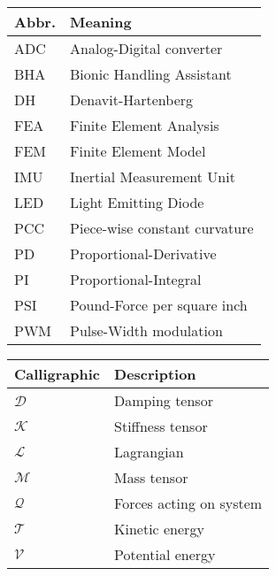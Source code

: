 \begin{spacing}{0.9}
\begin{multicols}{2}
\begin{table}[H]
\centering
    \begin{tabular}{p{1.5cm} p{5cm}} \hline
    \textbf{Abbr.}    &   \textbf{Meaning }\\ \hline
    ADC     &  Analog-Digital converter\\
    BHA    &  Bionic Handling Assistant\\
    DH    &  Denavit-Hartenberg\\
    FEA     &  Finite Element Analysis \\
    FEM     &  Finite Element Model \\
    IMU    & Inertial Measurement Unit \\
    LED   & Light Emitting Diode \\
    PCC   & Piece-wise constant curvature \\
    PD    & Proportional-Derivative \\
    PI   & Proportional-Integral \\
    PSI    & Pound-Force per square inch\\
    PWM    & Pulse-Width modulation\\  \hline
    \end{tabular}
\end{table}



\begin{table}[H]
\centering
    \begin{tabular}{p{2.5cm} p{4cm}} \hline
    \textbf{Calligraphic}    &   \textbf{Description }\\ \hline

    $\mathcal{D}$     &  Damping tensor \\
    $\mathcal{K}$     &  Stiffness tensor \\
    $\mathcal{L}$     &  Lagrangian \\
    $\mathcal{M}$     &  Mass tensor \\
    $\mathcal{Q}$     &  Forces acting on system \\
    $\mathcal{T}$     &  Kinetic energy \\
    $\mathcal{V}$     &  Potential energy \\ \hline

    
    \end{tabular}
\end{table}



\end{multicols}
\end{spacing}
